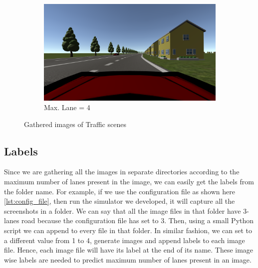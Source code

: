 \begin{figure}[H]
	\begin{subfigure}[b]{0.6\linewidth}
		\centering
    \includegraphics[width=\textwidth]{images/Chapter3/lane4.jpg}
    \caption{Max. Lane = 4}
	\end{subfigure}
	\caption{Gathered images of Traffic scenes}
  \label{}
\end{figure}

\subsection{Labels}
Since we are gathering all the images in separate directories according to the maximum number of lanes present in the image, we can easily get the labels from the folder name. For example, if we use the configuration file as shown here \ref{lst:config_file}, then run the simulator we developed, it will capture all the screenshots in a folder. We can say that all the image files in that folder have 3-lanes road because the configuration file has  set to 3. Then, using a small Python script we can append  to every file in that folder. In similar fashion, we can set  to a different value from 1 to 4, generate images and append labels to each image file. Hence, each image file will have its label at the end of its name. These image wise labels are needed to predict maximum number of lanes present in an image.

